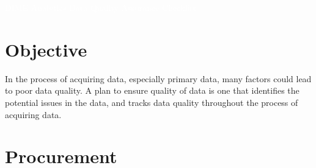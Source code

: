 \documentclass{report}
\newcommand{\titleBox}[1]{
	\begin{tcolorbox}
		[colframe = fontcolor,
		colback = fontcolor,
		sharp corners,
		halign = flush center,
		valign = center,
		height = 0.2\textwidth,
		after skip = 1cm]
		#1
	\end{tcolorbox}
}
\begin{document}
	\titleBox{
			\textcolor{white}{\Large{DIME Analytics Data Quality Assurance Checklist}}
	}

		\section{Objective}
		In the process of acquiring data, especially primary data, many factors could lead to poor data quality. A plan to ensure quality of data is one that identifies the potential issues in the data, and tracks data quality throughout the process of acquiring data.
	
	\vspace{5mm} %
		\section*{Procurement}


\newcommand{\makerow}[1]{%
	#1 &
	\stepcounter{row}%
	\mbox{\CheckBox[print,name=YES\therow, width=0.7em, height=0.7em]{}} &
	\mbox{\CheckBox[print,name=NO\therow, width=0.7em, height=0.7em]{}} &
	\mbox{\CheckBox[print,name=N/A\therow, width=0.7em, height=0.7em]{}} \\
}
\end{document}
